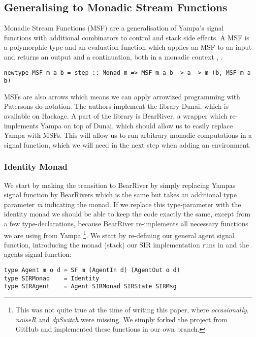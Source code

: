 \subsection{Generalising to Monadic Stream Functions}
Monadic Stream Functions (MSF) are a generalisation of Yampa's signal functions with additional combinators to control and stack side effects. A MSF is a polymorphic type and an evaluation function which applies an MSF to an input and returns an output and a continuation, both in a monadic context \cite{perez_functional_2016}, \cite{perez_extensible_2017}.
\begin{verbatim}
newtype MSF m a b = step :: Monad m => MSF m a b -> a -> m (b, MSF m a b)
\end{verbatim}

MSFs are also arrows which means we can apply arrowized programming with Patersons do-notation. The authors \cite{perez_functional_2016} implement the library Dunai, which is available on Hackage. A part of the library is BearRiver, a wrapper which re-implements Yampa on top of Dunai, which should allow us to easily replace Yampa with MSFs. This will allow us to run arbitrary monadic computations in a signal function, which we will need in the next step when adding an environment.

\subsubsection{Identity Monad}
We start by making the transition to BearRiver by simply replacing Yampas signal function by BearRivers which is the same but takes an additional type parameter \textit{m} indicating the monad. If we replace this type-parameter with the identity monad we should be able to keep the code exactly the same, except from a few type-declarations, because BearRiver re-implements all necessary functions we are using from Yampa \footnote{This was not quite true at the time of writing this paper, where \textit{occasionally}, \textit{noiseR} and \textit{dpSwitch} were missing. We simply forked the project from GitHub and implemented these functions in our own branch.}.
We start by re-defining our general agent signal function, introducing the monad (stack) our SIR implementation runs in and the agents signal function:

\begin{verbatim}
type Agent m o d = SF m (AgentIn d) (AgentOut o d)
type SIRMonad    = Identity
type SIRAgent    = Agent SIRMonad SIRState SIRMsg
\end{verbatim}

